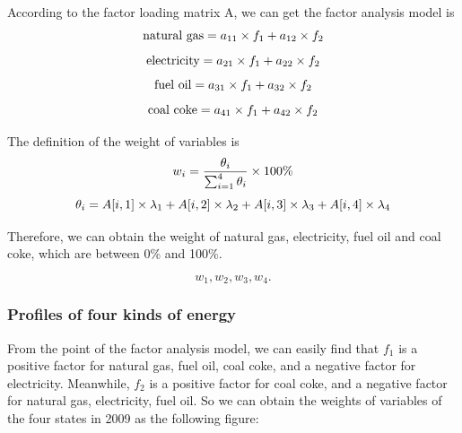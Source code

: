 \documentclass[a4paper,11pt]{article}
\begin{document}
\par According to the factor loading matrix A, we can get the factor analysis model is
\begin{equation}
    \centering
    \text{natural gas}=a_{11} \times f_1+a_{12} \times f_2
\end{equation}
\begin{equation}
    \centering
    \text{electricity}=a_{21} \times f_1+a_{22} \times f_2
\end{equation}
\begin{equation}
    \centering
    \text{fuel oil}=a_{31} \times f_1+a_{32} \times f_2
\end{equation}
\begin{equation}
    \centering
    \text{coal coke}=a_{41} \times f_1+a_{42} \times f_2
\end{equation}
\par The definition of the weight of variables is\cite{5}
\begin{equation}
    \centering
w_i=\frac{ \theta_i }{ \sum_{i=1}^{4}\theta_i } \times 100\%
\end{equation}
\begin{equation}
    \centering
\theta_i=A[i,1] \times \lambda_1+A[i,2] \times \lambda_2+A[i,3] \times \lambda_3+A[i,4] \times \lambda_4
\end{equation}

\par Therefore, we can obtain the weight of natural gas, electricity, fuel oil and coal coke, which are between 0\% and 100\%.

\[
w_1, w_2, w_3, w_4.
\]

\subsubsection{Profiles of four kinds of energy}

\par From the point of the factor analysis model, we can easily find that $f_1$ is a positive factor for natural gas, fuel oil, coal coke, and a negative factor for electricity. Meanwhile, $f_2$ is a positive factor for coal coke, and a negative factor for natural gas, electricity, fuel oil. 
    So we can obtain the weights of variables of the four states in 2009 as the following figure:
\end{document}
